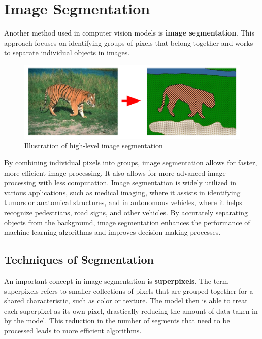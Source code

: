 \section{Image Segmentation}
    \large Another method used in computer vision models is \textbf{image segmentation}. This approach focuses on identifying groups of pixels that belong together and works to separate individual objects in images. 
    \begin{figure}[H]
        \centering
        \includegraphics[width=0.75\linewidth]{cv/segmentation-tiger.png}
        \caption{Illustration of high-level image segmentation}
        \label{fig:segmentation-tiger}
    \end{figure}

    By combining individual pixels into groups, image segmentation allows for faster, more efficient image processing. It also allows for more advanced image processing with less computation. Image segmentation is widely utilized in various applications, such as medical imaging, where it assists in identifying tumors or anatomical structures, and in autonomous vehicles, where it helps recognize pedestrians, road signs, and other vehicles. By accurately separating objects from the background, image segmentation enhances the performance of machine learning algorithms and improves decision-making processes. 

    \subsection{Techniques of Segmentation}
    An important concept in image segmentation is \textbf{superpixels}. The term superpixels refers to smaller collections of pixels that are grouped together for a shared characteristic, such as color or texture. The model then is able to treat each superpixel as its own pixel, drastically reducing the amount of data taken in by the model. This reduction in the number of segments that need to be processed leads to more efficient algorithms. \newline

